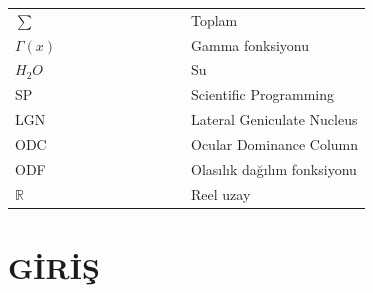 \documentclass[12pt,a4paper,turkish]{book}
\begin{document}
\begin{ozet}
\end{ozet}

\begin{abstractpage}
\end{abstractpage}

\begin{tesekkur}
\end{tesekkur}

\begin{thetableofcontents}
\end{thetableofcontents}

\begin{nomenclature}
\end{nomenclature}


\noindent 
\begin{tabular}{ll}
$\sum $ & Toplam \\ 
$\Gamma (x)$ & Gamma fonksiyonu \\ 
$H_{2}O$ & Su \\ 
SP \  \  \  \  \  \  \  \  \  \  \  \  \  \  \  \  \  \  \  \  & Scientific Programming \\ 
LGN & Lateral Geniculate Nucleus \\ 
ODC & Ocular Dominance Column \\ 
ODF & Olasılık dağılım fonksiyonu \\ 
$\mathbb{R}$ & Reel uzay \\ 
\end{tabular}

\newpage

\begin{thelistoffigures}
\end{thelistoffigures}

\begin{thelistoftables}
\end{thelistoftables}

\newpage

\setlength{\oddsidemargin}{15mm}
\setlength{\evensidemargin}{-5mm}%


\chapter{G\.{I}R\.{I}\c{S}}
\end{document}
